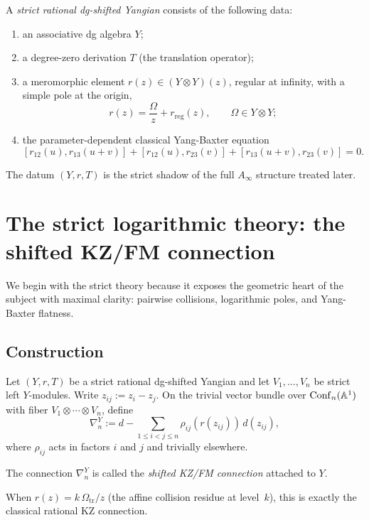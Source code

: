 \begin{definition}%
A \emph{strict rational dg-shifted Yangian} consists of the following data:
\begin{enumerate}[label=\textup{(\alph*)}]
 \item an associative dg algebra $Y$;
 \item a degree-zero derivation $T$ (the translation operator);
 \item a meromorphic element $r(z)\in (Y\otimes Y)(z)$, regular at infinity, with a simple pole at the origin,
 \[
 r(z)=\frac{\Omega}{z}+r_{\mathrm{reg}}(z),\qquad \Omega\in Y\otimes Y;
 \]
 \item the parameter-dependent classical Yang-Baxter equation
 \[
 [r_{12}(u),r_{13}(u+v)] + [r_{12}(u),r_{23}(v)] + [r_{13}(u+v),r_{23}(v)] = 0.
 \]
\end{enumerate}
\end{definition}

The datum $(Y,r,T)$ is the strict shadow of the full $A_\infty$ structure treated later.

\section{The strict logarithmic theory: the shifted KZ/FM connection}%

We begin with the strict theory because it exposes the geometric heart of the subject with maximal clarity: pairwise collisions, logarithmic poles, and Yang-Baxter flatness.

\subsection{Construction}
Let $(Y,r,T)$ be a strict rational dg-shifted Yangian and let $V_1,\dots,V_n$ be strict left $Y$-modules. Write $z_{ij}:=z_i-z_j$. On the trivial vector bundle over $\mathrm{Conf}_n(\mathbb A^1)$ with fiber $V_1\otimes\cdots\otimes V_n$, define
\[
 \nabla_n^Y
 :=
 d-\sum_{1\le i<j\le n}\rho_{ij}(r(z_{ij}))\,d(z_{ij}),
\]
where $\rho_{ij}$ acts in factors $i$ and $j$ and trivially elsewhere.

\begin{definition}
The connection $\nabla_n^Y$ is called the \emph{shifted KZ/FM connection} attached to $Y$.
\end{definition}

When $r(z)=k\,\Omega_{\mathrm{tr}}/z$ (the affine collision residue at level~$k$), this is exactly the classical rational KZ connection.

